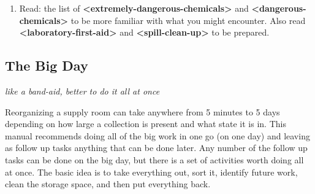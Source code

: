 \documentclass{report}
\begin{document}
\begin{enumerate}
\item{Read: the list of \textbf{\textless extremely-dangerous-chemicals\textgreater } and \textbf{\textless dangerous-chemicals\textgreater } to be more familiar with what you might encounter. Also read \textbf{\textless laboratory-first-aid\textgreater } and \textbf{\textless spill-clean-up\textgreater } to be prepared.}
\end{enumerate}

\subsection{The Big Day}
\textit{like a band-aid, better to do it all at once}

Reorganizing a supply room can take anywhere from 5 minutes to 5 days depending on how large a collection is present and what state it is in. This manual recommends doing all of the big work in one go (on one day) and leaving as follow up tasks anything that can be done later. Any number of the follow up tasks can be done on the big day, but there is a set of activities worth doing all at once. The basic idea is to take everything out, sort it, identify future work, clean the storage space, and then put everything back. 
\end{document}
